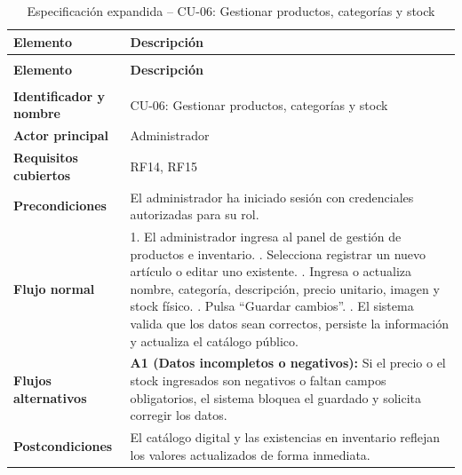 {\small
\begin{xltabular}{\textwidth}{|>{\raggedright\arraybackslash}p{3.4cm}|X|}
    \caption{Especificación expandida -- CU-06: Gestionar productos, categorías y stock}
    \label{tab:cu_expandido_admin} \\
    \hline
    \textbf{Elemento} & \textbf{Descripción} \\
    \hline
    \endfirsthead

     \\
    \hline
    \textbf{Elemento} & \textbf{Descripción} \\
    \hline
    \endhead

     \\
    \endfoot

    \endlastfoot

    \textbf{Identificador y nombre} & CU-06: Gestionar productos, categorías y stock \\*
    \hline
    \textbf{Actor principal} & Administrador \\*
    \hline
    \textbf{Requisitos cubiertos} & RF14, RF15 \\*
    \hline
    \textbf{Precondiciones} & El administrador ha iniciado sesión con credenciales autorizadas para su rol. \\*
    \hline
    \textbf{Flujo normal} & 
    1. El administrador ingresa al panel de gestión de productos e inventario. . Selecciona registrar un nuevo artículo o editar uno existente. . Ingresa o actualiza nombre, categoría, descripción, precio unitario, imagen y stock físico. . Pulsa ``Guardar cambios''. . El sistema valida que los datos sean correctos, persiste la información y actualiza el catálogo público. \\*
    \hline
    \textbf{Flujos alternativos} & \textbf{A1 (Datos incompletos o negativos):} Si el precio o el stock ingresados son negativos o faltan campos obligatorios, el sistema bloquea el guardado y solicita corregir los datos. \\*
    \hline
    \textbf{Postcondiciones} & El catálogo digital y las existencias en inventario reflejan los valores actualizados de forma inmediata. \\
    \hline
\end{xltabular}
}

